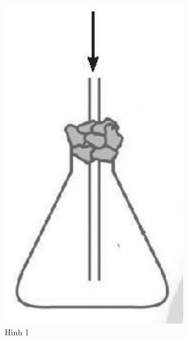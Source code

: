 \documentclass[10pt]{article}
\begin{document}
\begin{figure}[h]
\begin{center}
  \includegraphics[width=\textwidth]{2025_10_23_883c4b146e2332109fcdg-75(1)}
\captionsetup{labelformat=empty}
\caption{Hình 1}
\end{center}
\end{figure}
\end{document}
